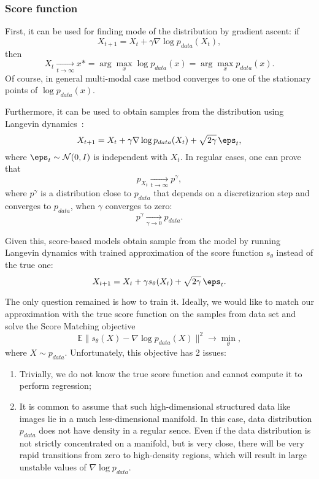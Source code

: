 \subsubsection{Score function} \label{sec:score}
First, it can be used for finding mode of the distribution by gradient ascent: if 
\[
    X_{t + 1} = X_t + \gamma \nabla \log p_{data}(X_t),
\]
then
\[
    X_t \xrightarrow[t \rightarrow \infty]{} x* = \arg\max\limits_{x} \log p_{data}(x) = \arg\max\limits_{x} p_{data}(x).
\]
Of course, in general multi-modal case method converges to one of the stationary points of $\log p_{data}(x)$.

Furthermore, it can be used to obtain samples from the distribution using Langevin dynamics~\cite{welling2011bayesian}:
\begin{equation}\label{eq:langevin_dynamics}
    X_{t + 1} = X_t + \gamma \nabla \log p_{data}(X_t) + \sqrt{2 \gamma} \, \eps_t,    
\end{equation}
where $\eps_t \sim \mathcal{N}(0, I)$ is independent with $X_t$. In regular cases, one can prove that 
\[
    p_{X_t} \xrightarrow[t \rightarrow \infty]{} p^{\gamma},
\]
where $p^{\gamma}$ is a distribution close to $p_{data}$ that depends on a discretizarion step and converges to $p_{data}$, when $\gamma$ converges to zero:
\[
    p^{\gamma} \xrightarrow[\gamma \rightarrow 0]{} p_{data}.
\]

Given this, score-based models obtain sample from the model by running Langevin dynamics with trained approximation of the score function $s_\theta$ instead of the true one:
\[
    X_{t + 1} = X_t + \gamma s_\theta(X_t) + \sqrt{2\gamma}\, \eps_t.
\]

The only question remained is how to train it. Ideally, we would like to match our approximation with the true score function on the samples from data set and solve the Score Matching objective
\begin{equation}\label{eq:score_matching}
\mathbb{E} \| s_\theta(X) - \nabla \log p_{data}(X)\|^2 \rightarrow \min\limits_{\theta},
\end{equation}
where $X \sim p_{data}$. Unfortunately, this objective has 2 issues:
\begin{enumerate}
    \item Trivially, we do not know the true score function and cannot compute it to perform regression;
    \item It is common to assume that such high-dimensional structured data like images lie in a much less-dimensional manifold. In this case, data distribution $p_{data}$ does not have density in a regular sence. Even if the data distribution is not strictly concentrated on a manifold, but is very close, there will be very rapid transitions from zero to high-density regions, which will result in large unstable values of $\nabla \log p_{data}$.
\end{enumerate}

